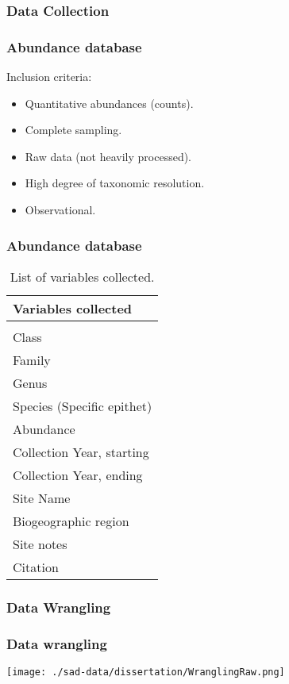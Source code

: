 \documentclass[14pt]{beamer}
\begin{document}
\subsubsection{Data Collection}
\begin{frame}[t]{}
\frametitle{Abundance database}
Inclusion criteria:
\begin{itemize}
\item Quantitative abundances (counts).
\item Complete sampling.
\item Raw data (not heavily processed).
\item High degree of taxonomic resolution.
\item Observational.
\end{itemize}
\end{frame}

\begin{frame}[shrink=30]
\frametitle{Abundance database}
\begin{table}
\begin{tabular}{l} 
 Variables collected\\ 
\hline
\\
 Class \\
 Family\\
 Genus \\
 Species (Specific epithet)\\
 Abundance \\
 Collection Year, starting\\
 Collection Year, ending \\
 Site Name \\
 Biogeographic region \\
 Site notes\\
 Citation\\ 
\end{tabular}
\caption{List of variables collected.}
\end{table}
\end{frame}

\subsubsection{Data Wrangling}
\begin{frame}[t]
\frametitle{Data wrangling}
\begin{center}
\texttt{[image: ./sad-data/dissertation/WranglingRaw.png]}
\end{center}
\end{frame}
\end{document}
